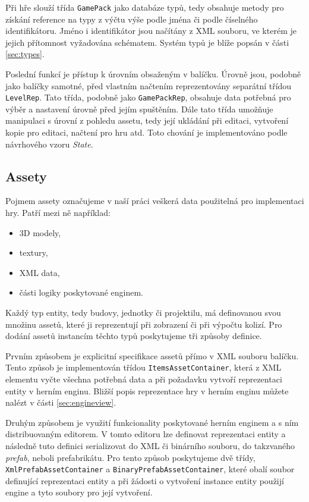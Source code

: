 Při hře slouží třída \texttt{GamePack} jako databáze typů, tedy obsahuje metody pro získání reference na typy z výčtu výše podle jména či podle číselného identifikátoru. Jméno i identifikátor jsou načítány z XML souboru, ve kterém je jejich přítomnost vyžadována schématem. Systém typů je blíže popsán v části \ref{sec:types}.

Poslední funkcí je přístup k úrovním obsaženým v balíčku. Úrovně jsou, podobně jako balíčky samotné, před vlastním načtením reprezentovány separátní třídou \texttt{LevelRep}. Tato třída, podobně jako \texttt{GamePackRep}, obsahuje data potřebná pro výběr a nastavení úrovně před jejím spuštěním. Dále tato třída umožňuje manipulaci s úrovní z pohledu assetu, tedy její ukládání při editaci, vytvoření kopie pro editaci, načtení pro hru atd. Toto chování je implementováno podle návrhového vzoru \textit{State}.

\subsection{Assety}
\label{sec:assets}
Pojmem assety označujeme v naší práci veškerá data použitelná pro implementaci hry. Patří mezi ně například:

\begin{itemize}
	\item 3D modely,
	\item textury,
	\item XML data,
	\item části logiky poskytované enginem.
\end{itemize}

Každý typ entity, tedy budovy, jednotky či projektilu, má definovanou svou množinu assetů, které ji reprezentují při zobrazení či při výpočtu kolizí. Pro dodání assetů instancím těchto typů poskytujeme tři způsoby definice.

Prvním způsobem je explicitní specifikace assetů přímo v XML souboru balíčku. Tento způsob je implementován třídou \texttt{ItemsAssetContainer}, která z XML elementu vyčte všechna potřebná data a při požadavku vytvoří reprezentaci entity v herním enginu. Bližší popis reprezentace hry v herním enginu můžete nalézt v části \ref{sec:engineview}.

Druhým způsobem je využití funkcionality poskytované herním enginem a s ním distribuovaným editorem. V tomto editoru lze definovat reprezentaci entity a následně tuto definici serializovat do XML či binárního souboru, do takzvaného \textit{prefab}, neboli prefabrikátu. Pro tento způsob poskytujeme dvě třídy, \texttt{XmlPrefabAssetContainer} a \texttt{BinaryPrefabAssetContainer}, které obalí soubor definující reprezentaci entity a při žádosti o vytvoření instance entity použijí engine a tyto soubory pro její vytvoření.

